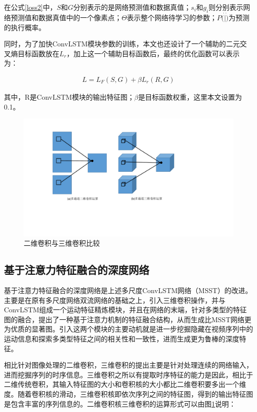 在公式\ref{loss2}中，$S$和$G$分别表示的是网络预测值和数据真值；$s_i$和$g_i$则分别表示网络预测值和数据真值中的一个像素点；$\Theta$表示整个网络待学习的参数；$P(\dot|\dot)$为预测的执行概率。

同时，为了加快ConvLSTM模块参数的训练，本文也还设计了一个辅助的二元交叉熵目标函数放在$L_r$，加上这一个辅助目标函数后，最终的优化函数可以表示为：

\begin{equation}
 \label{loss3}
 \begin{aligned}
   L = L_F(S,G) + \beta L_r(R,G)
   \end{aligned}
\end{equation}

其中，R是ConvLSTM模块的输出特征图；$\beta$是目标函数权重，这里本文设置为0.1。

\begin{figure}
\includegraphics[width=15cm]{figures/2D3Dconv}
\caption{二维卷积与三维卷积比较}
\label{2d3dconv}
\end{figure}

\subsection{基于注意力特征融合的深度网络}
基于注意力特征融合的深度网络是上述多尺度ConvLSTM网络（MSST）的改进。主要是在原有多尺度网络双流网络的基础之上，引入三维卷积操作，并与ConvLSTM组成一个运动特征精炼模块，并且在网络的末端，针对多类型的特征图的融合，提出了一种基于注意力机制的特征融合结构，从而生成比MSST网络更为优质的显著图。引入这两个模块的主要动机就是进一步挖掘隐藏在视频序列中的运动信息和探索多类型特征之间的相关性和一致性，进而生成更为鲁棒的深度特征。

相比针对图像处理的二维卷积，三维卷积的提出主要是针对处理连续的网络输入，进而挖掘序列的时序信息。三维卷积之所以有提取时序特征的能力是因此，相比于二维传统卷积，其输入特征图的大小和卷积核的大小都比二维卷积要多出一个维度。随着卷积核的滑动，三维卷积核即依次序列之间的特征图，得到的输出特征图是包含丰富的序列信息的。二维卷积核三维卷积的运算形式可以由图\ref{2d3dconv}说明：

